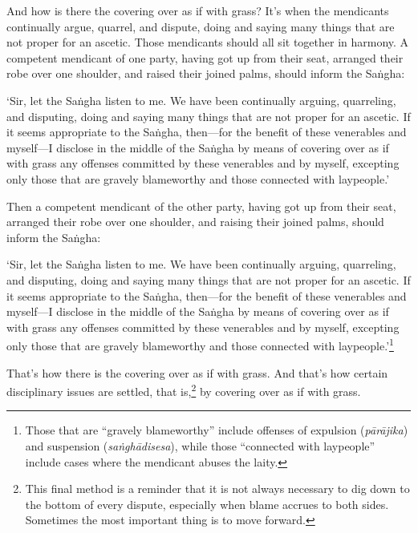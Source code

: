 \documentclass[12pt,openany]{book}%
\begin{document}
And how is there the covering over as if with grass? It’s when the mendicants continually argue, quarrel, and dispute, doing and saying many things that are not proper for an ascetic. Those mendicants should all sit together in harmony. A competent mendicant of one party, having got up from their seat, arranged their robe over one shoulder, and raised their joined palms, should inform the \textsanskrit{Saṅgha}: 

‘Sir, let the \textsanskrit{Saṅgha} listen to me. We have been continually arguing, quarreling, and disputing, doing and saying many things that are not proper for an ascetic. If it seems appropriate to the \textsanskrit{Saṅgha}, then—for the benefit of these venerables and myself—I disclose in the middle of the \textsanskrit{Saṅgha} by means of covering over as if with grass any offenses committed by these venerables and by myself, excepting only those that are gravely blameworthy and those connected with laypeople.’ 

Then a competent mendicant of the other party, having got up from their seat, arranged their robe over one shoulder, and raising their joined palms, should inform the \textsanskrit{Saṅgha}: 

‘Sir, let the \textsanskrit{Saṅgha} listen to me. We have been continually arguing, quarreling, and disputing, doing and saying many things that are not proper for an ascetic. If it seems appropriate to the \textsanskrit{Saṅgha}, then—for the benefit of these venerables and myself—I disclose in the middle of the \textsanskrit{Saṅgha} by means of covering over as if with grass any offenses committed by these venerables and by myself, excepting only those that are gravely blameworthy and those connected with laypeople.’\footnote{Those that are “gravely blameworthy” include offenses of expulsion (\textit{\textsanskrit{pārājika}}) and suspension (\textit{\textsanskrit{saṅghādisesa}}), while those “connected with laypeople” include cases where the mendicant abuses the laity. } 

That’s how there is the covering over as if with grass. And that’s how certain disciplinary issues are settled, that is,\footnote{This final method is a reminder that it is not always necessary to dig down to the bottom of every dispute, especially when blame accrues to both sides. Sometimes the most important thing is to move forward. } by covering over as if with grass. 
\end{document}
